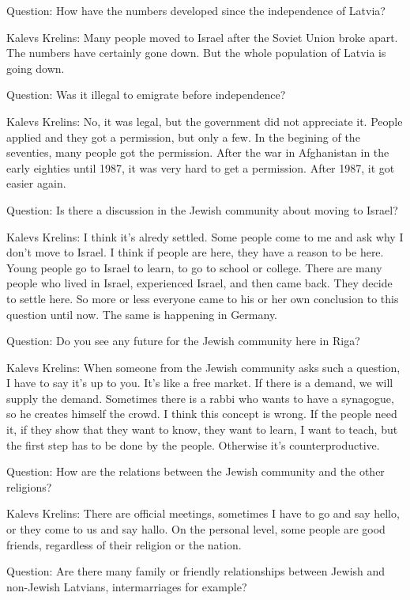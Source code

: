 Question: How have the numbers developed since the independence of Latvia?  

Kalevs Krelins: Many people moved to Israel after the Soviet Union broke apart. The numbers have certainly gone down. But the whole population of Latvia is going down.  

Question: Was it illegal to emigrate before independence? 

Kalevs Krelins: No, it was legal, but the government did not appreciate it. People applied and they got a permission, but only a few. In the begining of the seventies, many people got the permission. After the war in Afghanistan in the early eighties until 1987, it was very hard to get a permission. After 1987, it got easier again. 

Question: Is there a discussion in the Jewish community about moving to Israel? 

Kalevs Krelins: I think it's alredy settled. Some people come to me and ask why I don't move to Israel. I think if people are here, they have a reason to be here. Young people go to Israel to learn, to go to school or college. There are many people who lived in Israel, experienced Israel, and then came back. They decide to settle here. So more or less everyone came to his or her own conclusion to this question until now. The same is happening in Germany.  

Question: Do you see any future for the Jewish community here in Riga? 

Kalevs Krelins: When someone from the Jewish community asks such a question, I have to say it’s up to you. It’s like a free market. If there is a demand, we will supply the demand. Sometimes there is a rabbi who wants to have a synagogue, so he creates himself the crowd. I think this concept is wrong. If the people need it, if they show that they want to know, they want to learn, I want to teach, but the first step has to be done by the people. Otherwise it’s counterproductive.  

Question: How are the relations between the Jewish community and the other religions? 

Kalevs Krelins: There are official meetings, sometimes I have to go and say hello, or they come to us and say hallo. On the personal level, some people are good friends, regardless of their religion or the nation.  

Question: Are there many family or friendly relationships between Jewish and non-Jewish Latvians, intermarriages for example? 

